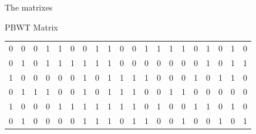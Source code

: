 \documentclass{beamer}
\begin{document}
\begin{frame}{The matrixes}
\begin{block}{PBWT Matrix}
\begin{table}[H]
\begin{tabular}{c|c|c|c|c|c|c|c|c|c|c|c|c|c|c|c|c|c|c|c}
        0 & 0 & 0 & 1 & 1 & 0 & 0 & 1 & 1 & 0 & 0 & 1 & 1 & 1 & 1 & 0 & 1 & 0
             & 1 & 0 \\
        0 & 1 & 0 & 1 & 1 & 1 & 1 & 1 & 1 & 0 & 0 & 0 & 0 & 0 & 0 & 0 & 1 & 0
             & 1 & 1 \\
        1 & 0 & 0 & 0 & 0 & 0 & 1 & 0 & 1 & 1 & 1 & 1 & 0 & 0 & 0 & 1 & 0 & 1
             & 1 & 0 \\
        0 & 1 & 1 & 1 & 0 & 0 & 1 & 0 & 1 & 1 & 1 & 0 & 0 & 1 & 1 & 0 & 0 & 0
             & 0 & 0 \\
        1 & 0 & 0 & 0 & 1 & 1 & 1 & 1 & 1 & 1 & 1 & 0 & 1 & 0 & 0 & 1 & 1 & 0
             & 1 & 0 \\
        0 & 1 & 0 & 0 & 0 & 0 & 1 & 1 & 1 & 0 & 1 & 1 & 0 & 0 & 1 & 0 & 0 & 1
             & 0 & 1 \\
        \hline
      \end{tabular}
    \end{table}
  \end{block}
\end{frame}
\end{document}
